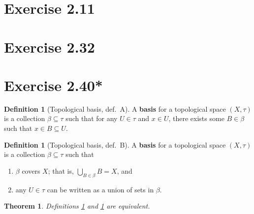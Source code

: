 \documentclass{article}
\newtheorem{theorem}[subsection]{Theorem}
\theoremstyle{definition}
\newtheorem{definition}[subsection]{Definition}
\begin{document}
\section{Exercise 2.11}
\section{Exercise 2.32}
\section{Exercise 2.40*}
\begin{definition}[Topological basis, def.\ A]\label{topbasisA}
A \textbf{basis} for a topological space $(X,\tau)$ is a collection $\beta \subseteq \tau$ 
such that for any $U \in \tau$ and $x \in U$, there exists some $B \in \beta$ such that
$x \in B \subseteq U$.
\end{definition}
\begin{definition}[Topological basis, def.\ B]\label{topbasisB}
A \textbf{basis} for a topological space $(X,\tau)$ is a collection $\beta \subseteq \tau$ such that
\begin{enumerate}
\item $\beta$ covers $X$; that is, $\bigcup_{B \in \beta} B = X$, and
\item any $U \in \tau$ can be written as a union of sets in $\beta$.
\end{enumerate}
\end{definition}
\begin{theorem}
Definitions \ref{topbasisA} and \ref{topbasisB} are equivalent.
\end{theorem}
\end{document}
